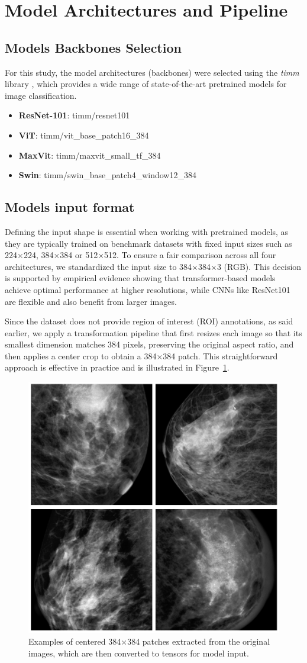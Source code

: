 \documentclass[a4paper,10pt]{book}
\begin{document}
\section{Model Architectures and Pipeline}

\subsection{Models Backbones Selection}

For this study, the model architectures (backbones) were selected using the \textit{timm} library \cite{TimmPyTorchImage2025}, which provides a wide range of state-of-the-art pretrained models for image classification.

\begin{itemize}
    \item \textbf{ResNet-101}: timm/resnet101
    \item \textbf{ViT}: timm/vit\_base\_patch16\_384
    \item \textbf{MaxVit}: timm/maxvit\_small\_tf\_384
    \item \textbf{Swin}: timm/swin\_base\_patch4\_window12\_384
\end{itemize}


\subsection{Models input format}

Defining the input shape is essential when working with pretrained models, as they are typically trained on benchmark datasets with fixed input sizes such as 224×224, 384×384 or 512×512. To ensure a fair comparison across all four architectures, we standardized the input size to 384×384×3 (RGB). This decision is supported by empirical evidence showing that transformer-based models achieve optimal performance at higher resolutions, while CNNs like ResNet101 are flexible and also benefit from larger images.

Since the dataset does not provide region of interest (ROI) annotations, as said earlier, we apply a transformation pipeline that first resizes each image so that its smallest dimension matches 384 pixels, preserving the original aspect ratio, and then applies a center crop to obtain a 384×384 patch. This straightforward approach is effective in practice and is illustrated in Figure~\ref{fig:384_patches}.

\begin{figure}[h!]
    \centering
    \includegraphics[width=0.3\linewidth]{reports//assets/384patchs.png}
    \caption[Input 384×384 patches]{Examples of centered 384×384 patches extracted from the original images, which are then converted to tensors for model input.}
    \label{fig:384_patches}
\end{figure}
\end{document}
